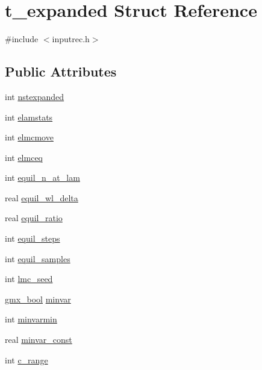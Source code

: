 \hypertarget{structt__expanded}{\section{t\-\_\-expanded \-Struct \-Reference}
\label{structt__expanded}
}


{\ttfamily \#include $<$inputrec.\-h$>$}

\subsection*{\-Public \-Attributes}
\begin{DoxyCompactItemize}
\item 
int \hyperlink{structt__expanded_aad79d564adb4efaa3d92d935ea0e4d35}{nstexpanded}
\item 
int \hyperlink{structt__expanded_a215935887f4e987a918027733b7fa4b2}{elamstats}
\item 
int \hyperlink{structt__expanded_ad5a6c998e27d7b496302ab5e219a0125}{elmcmove}
\item 
int \hyperlink{structt__expanded_ab07c29f39ea97c960a25b1e423d2db34}{elmceq}
\item 
int \hyperlink{structt__expanded_a99085c2b0eb9752e913e8eface5436aa}{equil\-\_\-n\-\_\-at\-\_\-lam}
\item 
real \hyperlink{structt__expanded_accd23f5d7b7cccd0073d087154eb99d4}{equil\-\_\-wl\-\_\-delta}
\item 
real \hyperlink{structt__expanded_a0d0ae9fb951d60dd2380b7c11564ceba}{equil\-\_\-ratio}
\item 
int \hyperlink{structt__expanded_a251c5d722b1c69ae2ad391ff207adf8c}{equil\-\_\-steps}
\item 
int \hyperlink{structt__expanded_abdf8ac156ea8e7408e624845145d5d8c}{equil\-\_\-samples}
\item 
int \hyperlink{structt__expanded_ad626c83c1a0f42662ee09e65f93e934c}{lmc\-\_\-seed}
\item 
\hyperlink{include_2types_2simple_8h_a8fddad319f226e856400d190198d5151}{gmx\-\_\-bool} \hyperlink{structt__expanded_af06170b32d39a1643657febdf63c82f8}{minvar}
\item 
int \hyperlink{structt__expanded_aacf89c1fe58cf73c239f2e08717df21c}{minvarmin}
\item 
real \hyperlink{structt__expanded_ac52516de6eaf9612cf55e956d0d3dc37}{minvar\-\_\-const}
\item 
int \hyperlink{structt__expanded_a6f36942c32fa8a05e48d54b4489cea10}{c\-\_\-range}

\end{DoxyCompactItemize}
